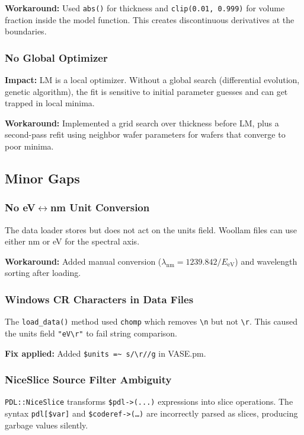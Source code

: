 \documentclass[11pt]{article}
\begin{document}
\textbf{Workaround:} Used \texttt{abs()} for thickness and
\texttt{clip(0.01, 0.999)} for volume fraction inside the model function.
This creates discontinuous derivatives at the boundaries.

\subsubsection{No Global Optimizer}
\textbf{Impact:} LM is a local optimizer. Without a global search
(differential evolution, genetic algorithm), the fit is sensitive to
initial parameter guesses and can get trapped in local minima.

\textbf{Workaround:} Implemented a grid search over thickness before LM,
plus a second-pass refit using neighbor wafer parameters for wafers
that converge to poor minima.

\subsection{Minor Gaps}

\subsubsection{No eV$\leftrightarrow$nm Unit Conversion}
The data loader stores but does not act on the units field.
Woollam files can use either nm or eV for the spectral axis.

\textbf{Workaround:} Added manual conversion ($\lambda_\text{nm} = 1239.842 / E_\text{eV}$)
and wavelength sorting after loading.

\subsubsection{Windows CR Characters in Data Files}
The \texttt{load\_data()} method used \texttt{chomp} which removes
\texttt{\textbackslash n} but not \texttt{\textbackslash r}. This caused
the units field \texttt{"eV\textbackslash r"} to fail string comparison.

\textbf{Fix applied:} Added \texttt{\$units =\textasciitilde{} s/\textbackslash r//g}
in VASE.pm.

\subsubsection{NiceSlice Source Filter Ambiguity}
\texttt{PDL::NiceSlice} transforms \texttt{\$pdl->(...)} expressions into
slice operations. The syntax \texttt{pdl[\$var]} and
\texttt{\$coderef->(\ldots)} are incorrectly parsed as slices, producing
garbage values silently.
\end{document}

